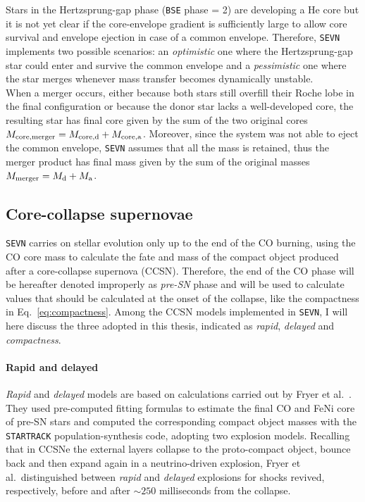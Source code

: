 \documentclass[a4paper,titlepage]{book}     	%
\begin{document}
Stars in the Hertzsprung-gap phase (\texttt{BSE} phase = 2) are developing a He core but it is not yet clear if the core-envelope gradient is sufficiently large to allow core survival and envelope ejection in case of a common envelope. Therefore, \texttt{SEVN} implements two possible scenarios: an \emph{optimistic} one where the Hertzsprung-gap star could enter and survive the common envelope and a \emph{pessimistic} one where the star  merges whenever mass transfer becomes dynamically unstable. \\

When a merger occurs, either because both stars still overfill their Roche lobe in the final configuration or because the donor star lacks a well-developed core, the resulting star has final core given by the sum of the two original cores $M_{\rm core,merger} = M_{\rm core, d} + M_{\rm core, a}$. Moreover, since the system was not able to eject the common envelope, \texttt{SEVN} assumes that all the mass is retained, thus the merger product has final mass given by the sum of the original masses $M_{\rm merger} = M_{\rm d} + M_{\rm a}$.





\subsection{Core-collapse supernovae}\label{subsec:SNmodels}
\texttt{SEVN} carries on stellar evolution only up to the end of the CO burning, using the CO core mass to calculate the fate and mass of the compact object produced after a core-collapse supernova (CCSN). Therefore, the end of the CO phase will be hereafter denoted improperly as \emph{pre-SN} phase and will be used to calculate values that should be calculated at the onset of the collapse, like the compactness in Eq.\ \ref{eq:compactness}. Among the CCSN models implemented in \texttt{SEVN}, I will here discuss the three adopted in this thesis, indicated as \emph{rapid}, \emph{delayed} and \emph{compactness}.

\paragraph{Rapid and delayed} \emph{Rapid} and \emph{delayed} models are based on calculations carried out by Fryer et al.\ \cite{Fryer2012}. They used pre-computed fitting formulas to estimate the final CO and FeNi core of pre-SN stars and computed the corresponding compact object masses with the \texttt{STARTRACK} \cite{Belczynski2010_WRwindsSTARTRACK} population-synthesis code, adopting two explosion models. Recalling that in CCSNe the external layers collapse to the proto-compact object, bounce back and then expand again in a neutrino-driven explosion, Fryer et al.\ distinguished between \emph{rapid} and \emph{delayed} explosions for shocks revived, respectively, before and after $\sim 250$ milliseconds from the collapse. 
\end{document}
